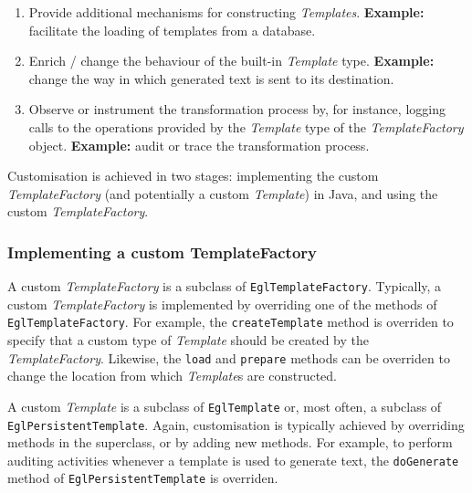 \begin{enumerate}
	\item Provide additional mechanisms for constructing \emph{Templates}. 
	      \textbf{Example:} facilitate the loading of templates from a database.
	\item Enrich / change the behaviour of the built-in \emph{Template} type.
	      \textbf{Example:} change the way in which generated text is sent to its destination.
	\item Observe or instrument the transformation process by, for instance, logging calls to
	      the operations provided by the \emph{Template} type of the \emph{TemplateFactory}
	      object.
	      \textbf{Example:} audit or trace the transformation process.
\end{enumerate}

Customisation is achieved in two stages: implementing the custom \emph{TemplateFactory} 
(and potentially a custom \emph{Template}) in Java, and using the custom 
\emph{TemplateFactory}. 

\subsubsection{Implementing a custom TemplateFactory}
A custom \emph{TemplateFactory} is a subclass of \texttt{EglTemplateFactory}. Typically, a custom \emph{TemplateFactory} is implemented by overriding one of the methods of \texttt{EglTemplateFactory}. For example, the \texttt{createTemplate} method is overriden to specify that a custom type of \emph{Template} should be created by the \emph{TemplateFactory}. Likewise, the \texttt{load} and \texttt{prepare} methods can be overriden to change the location from which \emph{Template}s are constructed.

A custom \emph{Template} is a subclass of \texttt{EglTemplate} or, most often, a subclass of \texttt{EglPersistentTemplate}. Again, customisation is typically achieved by overriding methods in the superclass, or by adding new methods. For example, to perform auditing activities whenever a template is used to generate text, the \texttt{doGenerate} method of \texttt{EglPersistentTemplate} is overriden.


